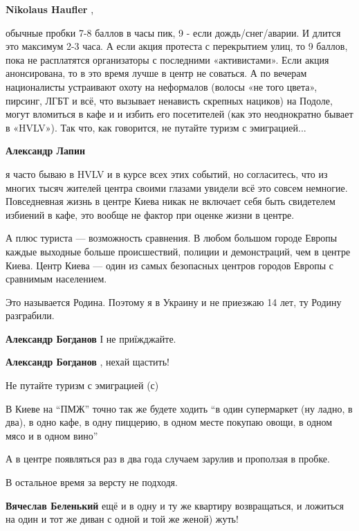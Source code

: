 \begin{itemize}
\begin{itemize}
\textbf{Nikolaus Haufler} , 

обычные пробки 7-8 баллов в часы пик, 9 - если дождь/снег/аварии. И длится это
максимум 2-3 часа. А если акция протеста с перекрытием улиц, то 9 баллов, пока
не расплатятся организаторы с последними «активистами». Если акция
анонсирована, то в это время лучше в центр не соваться. А по вечерам
националисты устраивают охоту на неформалов (волосы «не того цвета», пирсинг,
ЛГБТ и всё, что вызывает ненависть скрепных нациков) на Подоле, могут вломиться
в кафе и и избить его посетителей (как это неоднократно бывает в «HVLV»). Так
что, как говорится, не путайте туризм с эмиграцией...


\textbf{Александр Лапин} 

я часто бываю в HVLV и в курсе всех этих событий, но согласитесь, что из многих
тысяч жителей центра своими глазами увидели всё это совсем немногие.
Повседневная жизнь в центре Киева никак не включает себя быть свидетелем
избиений в кафе, это вообще не фактор при оценке жизни в центре.

А плюс туриста — возможность сравнения. В любом большом городе Европы каждые
выходные больше происшествий, полиции и демонстраций, чем в центре Киева. Центр
Киева — один из самых безопасных центров городов Европы с сравнимым населением.

\end{itemize} %

Это называется Родина.
Поэтому я в Украину и не приезжаю 14 лет, ту Родину разграбили.

\begin{itemize} %
\textbf{Александр Богданов} І не приїжджайте.

\textbf{Александр Богданов} , нехай щастить!
\end{itemize} %


Не путайте туризм с эмиграцией (с)

В Киеве на \enquote{ПМЖ} точно так же будете ходить \enquote{в один супермаркет (ну ладно, в
два), в одно кафе, в одну пиццерию, в одном месте покупаю овощи, в одном мясо и
в одном вино}

А в центре появляться раз в два года случаем зарулив и проползая в пробке.

В остальное время за версту не подходя.

\begin{itemize} %
\textbf{Вячеслав Беленький} ещё и в одну и ту же квартиру возвращаться, и ложиться на один и тот же диван с одной и той же женой) жуть!


\end{itemize}
\end{itemize}
